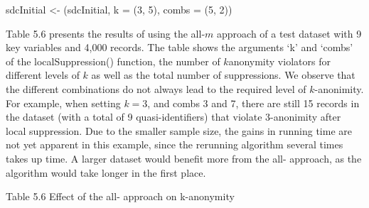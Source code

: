 \documentclass[letterpaper,10pt,english]{sphinxmanual}
\begin{document}
\begin{DUlineblock}{0em}
\item[] 
\item[] sdcInitial \textless{}- (sdcInitial, k = (3, 5),
combs = (5, 2))
\end{DUlineblock}

Table 5.6 presents the results of using the all-\(m\) approach of
a test dataset with 9 key variables and 4,000 records. The table shows
the arguments ‘k’ and ‘combs’ of the localSuppression() function, the
number of \(k\)\sphinxstyleemphasis{-}anonymity violators for different levels of
\(k\) as well as the total number of suppressions. We observe that
the different combinations do not always lead to the required level of
\(k\)-anonimity. For example, when setting \(k = 3\), and combs
3 and 7, there are still 15 records in the dataset (with a total of 9
quasi-identifiers) that violate 3-anonimity after local suppression. Due
to the smaller sample size, the gains in running time are not yet
apparent in this example, since the rerunning algorithm several times
takes up time. A larger dataset would benefit more from the all-
approach, as the algorithm would take longer in the first place.

Table 5.6 Effect of the all- approach on k-anonymity
\end{document}
